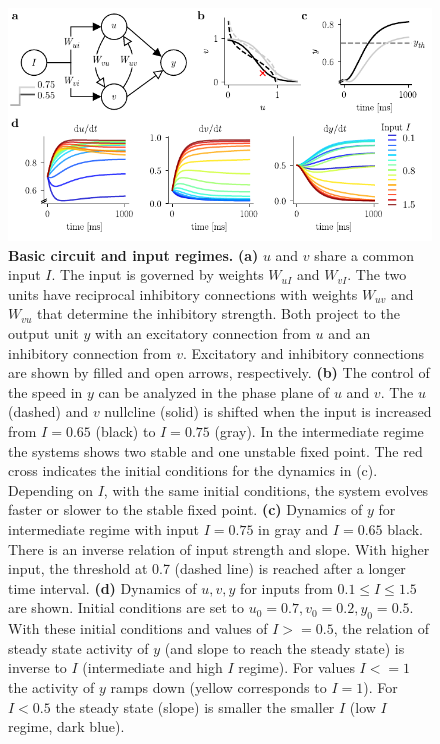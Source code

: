 \documentclass[10pt]{article}
\begin{document}
\begin{figure}[ht]
	\centering
	\includegraphics{figures/defCircuit_nullcl.pdf}
	\caption{\textbf{Basic circuit and input regimes.} 
	\textbf{(a)} $u$ and $v$ share a common input $I$. The input is governed by weights $W_{uI}$ and $W_{vI}$. The two units have reciprocal inhibitory connections with weights $W_{uv}$ and $W_{vu}$ that determine the inhibitory strength. Both project to the output unit $y$ with an excitatory connection from $u$ and an inhibitory connection from $v$. Excitatory and inhibitory connections are shown by filled and open arrows, respectively. 
	\textbf{(b)} The control of the speed in $y$ can be analyzed in the phase plane of $u$ and $v$. The $u$ (dashed) and $v$ nullcline (solid) is shifted when the input is increased from $I=0.65$ (black) to $I=0.75$ (gray). In the intermediate regime the systems shows two stable and one unstable fixed point. The red cross indicates the initial conditions for the dynamics in (c). Depending on $I$, with the same initial conditions, the system evolves faster or slower to the stable fixed point. 
	\textbf{(c)} Dynamics of $y$ for intermediate regime with input $I=0.75$ in gray and $I=0.65$ black. There is an inverse relation of input strength and slope. With higher input, the threshold at 0.7 (dashed line) is reached after a longer time interval. 
	\textbf{(d)} Dynamics of $u, v, y$ for inputs from $0.1\leq I \leq 1.5$ are shown. Initial conditions are set to $u_0=0.7 , v_0=0.2 , y_0=0.5$. With these initial conditions and values of $I>=0.5$, the relation of steady state activity of $y$ (and slope to reach the steady state) is inverse to $I$ (intermediate and high $I$ regime). For values $I<=1$ the activity of $y$ ramps down (yellow corresponds to $I=1$). For $I<0.5$ the steady state (slope) is smaller the smaller $I$ (low $I$ regime, dark blue).}
\label{fig:circuit}
\end{figure}
\end{document}
